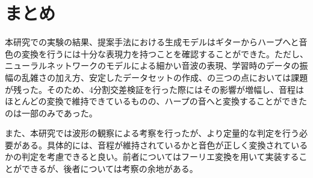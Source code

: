 \chapter{まとめ}

本研究での実験の結果、提案手法における生成モデルはギターからハープへと音色の変換を行うには十分な表現力を持つことを確認することができた。ただし、ニューラルネットワークのモデルによる細かい音波の表現、学習時のデータの振幅の乱雑さの加え方、安定したデータセットの作成、の三つの点においては課題が残った。そのため、4分割交差検証を行った際にはその影響が増幅し、音程はほとんどの変換で維持できているものの、ハープの音へと変換することができたのは一部のみであった。

また、本研究では波形の観察による考察を行ったが、より定量的な判定を行う必要がある。具体的には、音程が維持されているかと音色が正しく変換されているかの判定を考慮できると良い。前者についてはフーリエ変換を用いて実装することができるが、後者については考察の余地がある。




